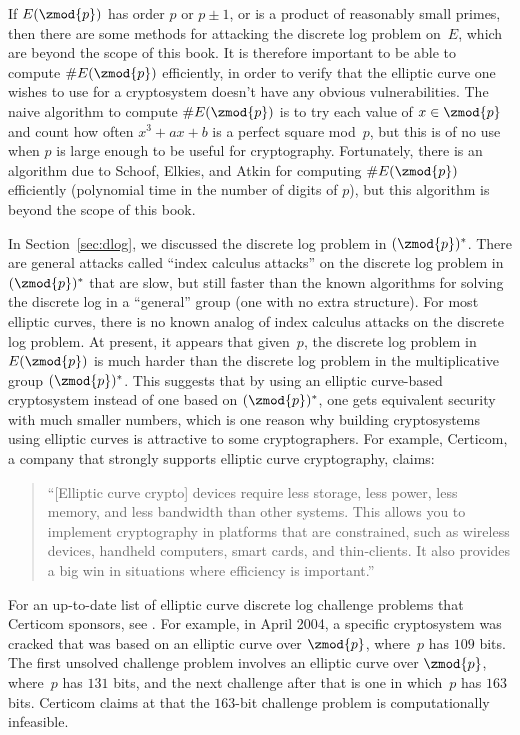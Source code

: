 If $E(\zmod{p})$ has order $p$ or $p\pm 1$, or is a product of
reasonably small primes, then there are some methods for attacking the
discrete log problem on~$E$, which are beyond the scope of this book.
It is therefore important to be able to compute $\#E(\zmod{p})$
efficiently, in order to verify that the elliptic curve one wishes to
use for a cryptosystem doesn't have any obvious vulnerabilities.  The
naive algorithm to compute $\#E(\zmod{p})$ is to try each value of
$x\in\zmod{p}$ and count how often $x^3+ax+b$ is a perfect square
mod~$p$, but this is of no use when $p$ is large enough to be useful
for cryptography.  Fortunately, there is an algorithm due to Schoof,
Elkies, and Atkin for computing $\#E(\zmod{p})$ efficiently
(polynomial time in the number of digits of $p$), but this algorithm
is beyond the scope of this book.

In Section~\ref{sec:dlog}, we discussed the discrete log problem in
$(\zmod{p})^*$.  There are general attacks called ``index calculus
attacks'' on the discrete log problem in $(\zmod{p})^*$ that are slow,
but still faster than the known algorithms for solving the discrete
log in a ``general'' group (one with no extra structure).  For most
elliptic curves, there is no known analog of index calculus attacks
on the discrete log problem.  At present, it appears that given~$p$,
the discrete log problem in $E(\zmod{p})$ is much harder than the
discrete log problem in the multiplicative group $(\zmod{p})^*$.  This
suggests that by using an elliptic curve-based cryptosystem instead of
one based on $(\zmod{p})^*$, one gets equivalent security with much
smaller numbers, which is one reason why building cryptosystems using
elliptic curves is attractive to some cryptographers.  For example,
Certicom, a company that strongly supports elliptic curve
cryptography, claims:
\begin{quote}
``[Elliptic curve crypto] devices require less storage, less
power, less memory, and less bandwidth than other systems. This allows
you to implement cryptography in platforms that are constrained, such
as wireless devices, handheld computers, smart cards, and
thin-clients. It also provides a big win in situations where
efficiency is important.''
\end{quote}

For an up-to-date list of elliptic curve discrete log challenge
problems that Certicom sponsors, see \cite{certicom:challenge}.  For
example, in April 2004, a specific cryptosystem was cracked that was
based on an elliptic curve over $\zmod{p}$, where~$p$ has $109$ bits.
The first unsolved challenge problem involves an elliptic curve over
$\zmod{p}$, where~$p$ has $131$ bits, and the next challenge after
that is one in which~$p$ has $163$ bits.  Certicom claims at
\cite{certicom:challenge} that the $163$-bit challenge problem is
computationally infeasible.


